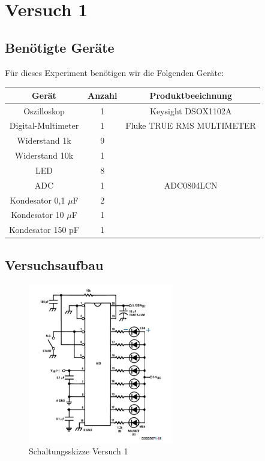 \chapter{Versuch 1}

\section{Benötigte Geräte}

Für dieses Experiment benötigen wir die Folgenden Geräte:

\begin{tabular}[h]{c|c|c}
    Gerät & Anzahl & Produktbeeichnung\\
    \hline
    Oszilloskop & 1  & Keysight DSOX1102A\\
    \hline
	Digital-Multimeter & 1 & Fluke TRUE RMS MULTIMETER\\
	\hline 
	Widerstand 1k & 9 &  \\
	\hline 
	Widerstand 10k & 1 &  \\
	\hline
	LED & 8 & \\
	\hline
	ADC & 1 & ADC0804LCN \\
	\hline
	Kondesator 0,1 $\mu$F & 2 & \\
	\hline
	Kondesator 10 $\mu$F & 1 & \\
	\hline
	Kondesator 150 pF & 1 & 
        \label{tab:Materialliste Versuch 1}
\end{tabular}

\section{Versuchsaufbau}


\begin{figure}[H]
	\centering
	\includegraphics[height=7cm]{images/Schaltungsskizze-versuch-eins.jpg} 
	\caption[]{Schaltungsskizze Versuch 1}
\end{figure}

